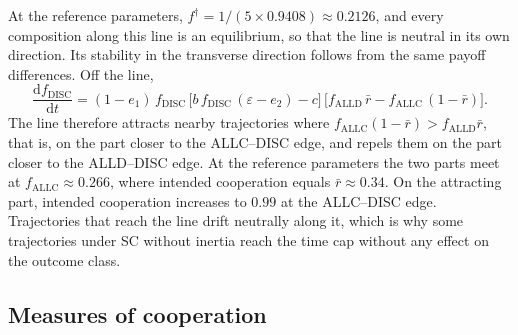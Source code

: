 \documentclass[10pt]{wlscirep}
\newcommand{\dd}{\mathrm{d}}
\newcommand{\ALLC}{\mathrm{ALLC}}
\newcommand{\ALLD}{\mathrm{ALLD}}
\newcommand{\DISC}{\mathrm{DISC}}
\theoremstyle{plain}
\theoremstyle{remark}
\begin{document}
At the reference parameters, $f^\dagger=1/(5\times0.9408)\approx0.2126$, and every composition along this line is an equilibrium, so that the line is neutral in its own direction. Its stability in the transverse direction follows from the same payoff differences. Off the line,
\begin{equation}
\frac{\dd f_{\DISC}}{\dd t}=(1-e_1)\,f_{\DISC}\,\bigl[b\,f_{\DISC}\,(\varepsilon-e_2)-c\bigr]\,\bigl[f_{\ALLD}\,\bar r-f_{\ALLC}\,(1-\bar r)\bigr].
\label{eq:s-sc-transverse}
\end{equation}
The line therefore attracts nearby trajectories where $f_{\ALLC}(1-\bar r)>f_{\ALLD}\bar r$, that is, on the part closer to the ALLC--DISC edge, and repels them on the part closer to the ALLD--DISC edge. At the reference parameters the two parts meet at $f_{\ALLC}\approx0.266$, where intended cooperation equals $\bar r\approx0.34$. On the attracting part, intended cooperation increases to $0.99$ at the ALLC--DISC edge. Trajectories that reach the line drift neutrally along it, which is why some trajectories under SC without inertia reach the time cap without any effect on the outcome class.

\subsection{Measures of cooperation}
\end{document}
